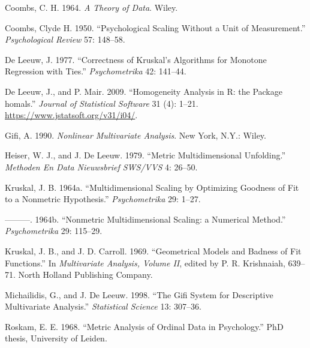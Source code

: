\documentclass[
  12pt,
]{article}
\newlength{\cslhangindent}
\newenvironment{CSLReferences}[2] %
 {\begin{list}{}{%
  \setlength{\itemindent}{0pt}
  \setlength{\leftmargin}{0pt}
  \setlength{\parsep}{0pt}
  \ifodd #1
   \setlength{\leftmargin}{\cslhangindent}
   \setlength{\itemindent}{-1\cslhangindent}
  \fi
  \setlength{\itemsep}{#2\baselineskip}}}
 {\end{list}}
\begin{document}
\label{refs}
\begin{CSLReferences}{1}{0}
Coombs, C. H. 1964. \emph{{A Theory of Data}}. Wiley.

Coombs, Clyde H. 1950. {``Psychological Scaling Without a Unit of Measurement.''} \emph{Psychological Review} 57: 148--58.

De Leeuw, J. 1977. {``Correctness of Kruskal's Algorithms for Monotone Regression with Ties.''} \emph{Psychometrika} 42: 141--44.

De Leeuw, J., and P. Mair. 2009. {``{Homogeneity Analysis in {R}: the Package homals}.''} \emph{Journal of Statistical Software} 31 (4): 1--21. \url{https://www.jstatsoft.org/v31/i04/}.

Gifi, A. 1990. \emph{Nonlinear Multivariate Analysis}. New York, N.Y.: Wiley.

Heiser, W. J., and J. De Leeuw. 1979. {``Metric Multidimensional Unfolding.''} \emph{Methoden En Data Nieuwsbrief SWS/VVS} 4: 26--50.

Kruskal, J. B. 1964a. {``{Multidimensional Scaling by Optimizing Goodness of Fit to a Nonmetric Hypothesis}.''} \emph{Psychometrika} 29: 1--27.

---------. 1964b. {``{Nonmetric Multidimensional Scaling: a Numerical Method}.''} \emph{Psychometrika} 29: 115--29.

Kruskal, J. B., and J. D. Carroll. 1969. {``{Geometrical Models and Badness of Fit Functions}.''} In \emph{Multivariate Analysis, Volume II}, edited by P. R. Krishnaiah, 639--71. North Holland Publishing Company.

Michailidis, G., and J. De Leeuw. 1998. {``The Gifi System for Descriptive Multivariate Analysis.''} \emph{Statistical Science} 13: 307--36.

Roskam, E. E. 1968. {``{Metric Analysis of Ordinal Data in Psychology}.''} PhD thesis, University of Leiden.

\end{CSLReferences}
\end{document}
